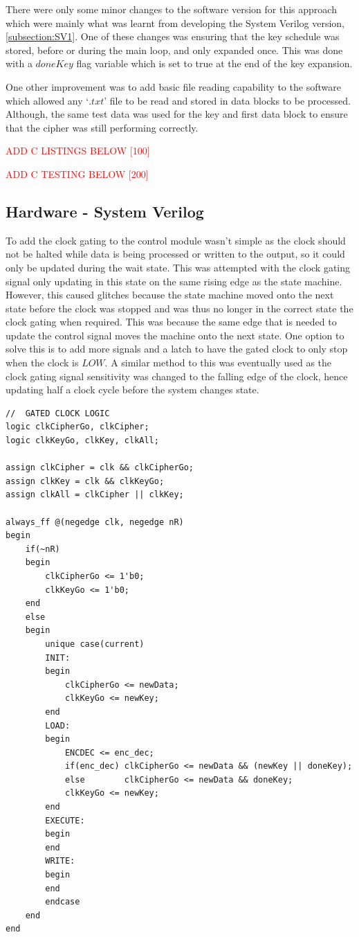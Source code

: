 \documentclass[12pt,twoside,a4paper]{report}
\begin{document}
	There were only some minor changes to the software version for this approach which were mainly what was learnt from developing the System Verilog version, \autoref{subsection:SV1}. One of these changes was ensuring that the key schedule was stored, before or during the main loop, and only expanded once. This was done with a $doneKey$ flag variable which is set to true at the end of the key expansion.
	
	One other improvement was to add basic file reading capability to the software which allowed any  `$.txt$' file to be read and stored in data blocks to be processed. Although, the same test data was used for the key and first data block to ensure that the cipher was still performing correctly.
	
	\textcolor{red}{ADD C LISTINGS BELOW [100]}
    
	\textcolor{red}{ADD C TESTING BELOW [200]}   
    
	\subsection{Hardware - System Verilog}
	\label{subsection:SV2}
	
	To add the clock gating to the control module wasn't simple as the clock should not be halted while data is being processed or written to the output, so it could only be updated during the wait state. This was attempted with the clock gating signal only updating in this state on the same rising edge as the state machine. However, this caused glitches because the state machine moved onto the next state before the clock was stopped and was thus no longer in the correct state the clock gating when required. This was because the same edge that is needed to update the control signal moves the machine onto the next state. One option to solve this is to add more signals and a latch to have the gated clock to only stop when the clock is $LOW$. A similar method to this was eventually used as the clock gating signal sensitivity was changed to the falling edge of the clock, hence updating half a clock cycle before the system changes state.

	\begin{minipage}{\linewidth}
	\begin{lstlisting}[label={lst:Clock_Gating},caption={The next state logic for the ($PRE$) control module},style=SVStyle]
//	GATED CLOCK LOGIC
logic clkCipherGo, clkCipher;
logic clkKeyGo, clkKey, clkAll;

assign clkCipher = clk && clkCipherGo;
assign clkKey = clk && clkKeyGo;
assign clkAll = clkCipher || clkKey;

always_ff @(negedge clk, negedge nR)
begin
	if(~nR)
	begin
		clkCipherGo <= 1'b0;
		clkKeyGo <= 1'b0;
	end
	else
	begin
		unique case(current)
		INIT:
		begin
			clkCipherGo <= newData;
			clkKeyGo <= newKey;
		end
		LOAD:
		begin
			ENCDEC <= enc_dec;
			if(enc_dec)	clkCipherGo <= newData && (newKey || doneKey);
			else		clkCipherGo <= newData && doneKey;
			clkKeyGo <= newKey;
		end
		EXECUTE:
		begin
		end
		WRITE:
		begin
		end
		endcase
	end
end
	\end{lstlisting}
	\end{minipage}
	
\end{document}
